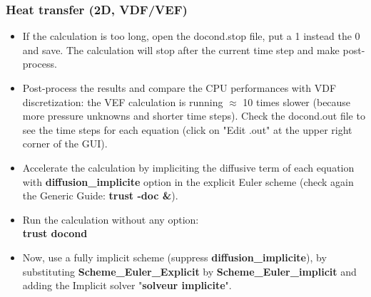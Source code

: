 \documentclass[10pt, hyperref={unicode=true,pdfusetitle, bookmarks=true,bookmarksnumbered=false,bookmarksopen=false, breaklinks=false,pdfborder={0 0l 1},backref=true,colorlinks=true,linkcolor=darkblue,pageanchor}]{beamer}
\begin{document}
\begin{frame}
\frametitle{Heat transfer (2D, VDF/VEF)}
\begin{block}{}

\begin{itemize}
\item If the calculation is too long, open the docond.stop file, put a 1 instead the 0 and save.
The calculation will stop after the current time step and make post-process.

\item Post-process the results and compare the CPU performances with VDF discretization: the VEF calculation is running $\approx$ 10 times slower (because more pressure unknowns and shorter time steps). Check the docond.out file to see the time steps for each equation (click on "Edit .out" at the upper right corner of the GUI).

\item Accelerate the calculation by impliciting the diffusive term of each equation with \textbf{diffusion\_implicite} option in the explicit Euler scheme (check again the Generic Guide: \textbf{trust -doc \&}). 

\item Run the calculation without any option: \\
\textbf{trust docond}

\item \label{schema_impl} Now, use a fully implicit scheme (suppress \textbf{diffusion\_implicite}), by substituting \textbf{Scheme\_Euler\_Explicit} by \textbf{Scheme\_Euler\_implicit} and adding the Implicit solver "\textbf{solveur implicite}".

\end{itemize}

\end{block}
\end{frame}
\end{document}
